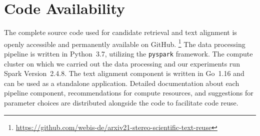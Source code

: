 \section*{Code Availability}


The complete source code used for candidate retrieval and text alignment is openly accessible and permanently available on GitHub.%
\footnote{\url{https://github.com/webis-de/arxiv21-stereo-scientific-text-reuse}}
The data processing pipeline is written in Python~3.7, utilizing the \texttt{pyspark} framework. The compute cluster on which we carried out the data processing and our experiments run Spark Version~2.4.8. The text alignment component is written in Go~1.16 and can be used as a standalone application. Detailed documentation about each pipeline component, recommendations for compute resources, and suggestions for parameter choices are distributed alongside the code to facilitate code reuse.
